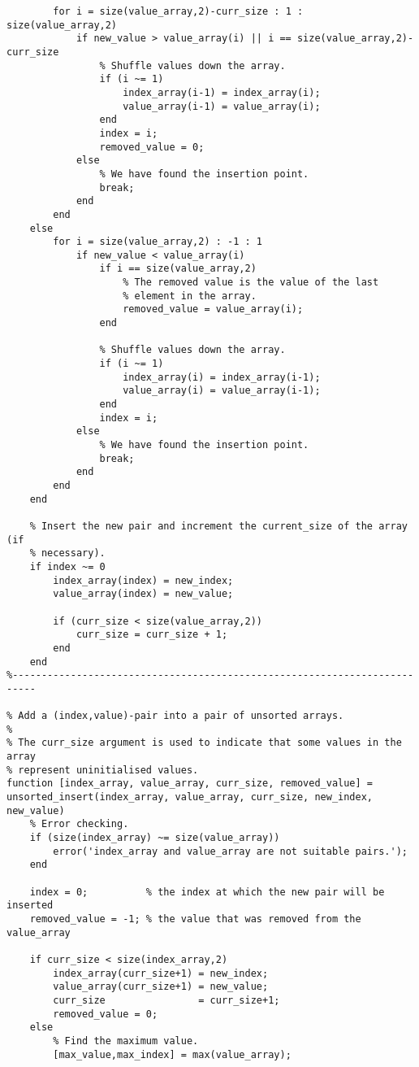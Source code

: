 \begin{lstlisting}
        for i = size(value_array,2)-curr_size : 1 : size(value_array,2)
            if new_value > value_array(i) || i == size(value_array,2)-curr_size
                % Shuffle values down the array.
                if (i ~= 1)
                    index_array(i-1) = index_array(i);
                    value_array(i-1) = value_array(i);
                end
                index = i;
                removed_value = 0;
            else
                % We have found the insertion point.
                break;
            end
        end
    else
        for i = size(value_array,2) : -1 : 1
            if new_value < value_array(i)
                if i == size(value_array,2)
                    % The removed value is the value of the last
                    % element in the array.
                    removed_value = value_array(i);
                end

                % Shuffle values down the array.
                if (i ~= 1)
                    index_array(i) = index_array(i-1);
                    value_array(i) = value_array(i-1);
                end
                index = i;
            else
                % We have found the insertion point.
                break;
            end
        end
    end

    % Insert the new pair and increment the current_size of the array (if
    % necessary).
    if index ~= 0
        index_array(index) = new_index;
        value_array(index) = new_value;

        if (curr_size < size(value_array,2))
            curr_size = curr_size + 1;
        end
    end
%--------------------------------------------------------------------------

% Add a (index,value)-pair into a pair of unsorted arrays.
%
% The curr_size argument is used to indicate that some values in the array
% represent uninitialised values.
function [index_array, value_array, curr_size, removed_value] = unsorted_insert(index_array, value_array, curr_size, new_index, new_value)
    % Error checking.
    if (size(index_array) ~= size(value_array))
        error('index_array and value_array are not suitable pairs.');
    end

    index = 0;          % the index at which the new pair will be inserted
    removed_value = -1; % the value that was removed from the value_array

    if curr_size < size(index_array,2)
        index_array(curr_size+1) = new_index;
        value_array(curr_size+1) = new_value;
        curr_size                = curr_size+1;
        removed_value = 0;
    else
        % Find the maximum value.
        [max_value,max_index] = max(value_array);


\end{lstlisting}
